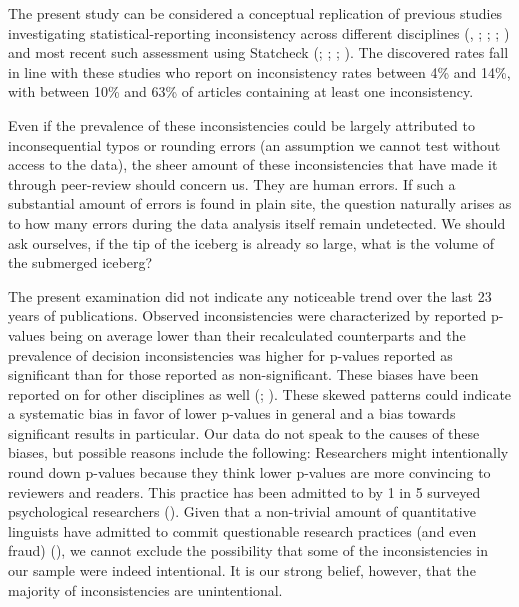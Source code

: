 \documentclass[
  doc,
  longtable,
  nolmodern,
  notxfonts,
  notimes,
  colorlinks=true,linkcolor=blue,citecolor=blue,urlcolor=blue]{apa7}
\begin{document}
The present study can be considered a conceptual replication of previous
studies investigating statistical-reporting inconsistency across
different disciplines (, ;
;
;
) and most
recent such assessment using Statcheck
(;
;
;
). The
discovered rates fall in line with these studies who report on
inconsistency rates between 4\% and 14\%, with between 10\% and 63\% of
articles containing at least one inconsistency.

Even if the prevalence of these inconsistencies could be largely
attributed to inconsequential typos or rounding errors (an assumption we
cannot test without access to the data), the sheer amount of these
inconsistencies that have made it through peer-review should concern us.
They are human errors. If such a substantial amount of errors is found
in plain site, the question naturally arises as to how many errors
during the data analysis itself remain undetected. We should ask
ourselves, if the tip of the iceberg is already so large, what is the
volume of the submerged iceberg?

The present examination did not indicate any noticeable trend over the
last 23 years of publications. Observed inconsistencies were
characterized by reported p-values being on average lower than their
recalculated counterparts and the prevalence of decision inconsistencies
was higher for p-values reported as significant than for those reported
as non-significant. These biases have been reported on for other
disciplines as well (; ).
These skewed patterns could indicate a systematic bias in favor of lower
p-values in general and a bias towards significant results in
particular. Our data do not speak to the causes of these biases, but
possible reasons include the following: Researchers might intentionally
round down p-values because they think lower p-values are more
convincing to reviewers and readers. This practice has been admitted to
by 1 in 5 surveyed psychological researchers
(). Given that a
non-trivial amount of quantitative linguists have admitted to commit
questionable research practices (and even fraud)
(), we cannot
exclude the possibility that some of the inconsistencies in our sample
were indeed intentional. It is our strong belief, however, that the
majority of inconsistencies are unintentional.
\end{document}
